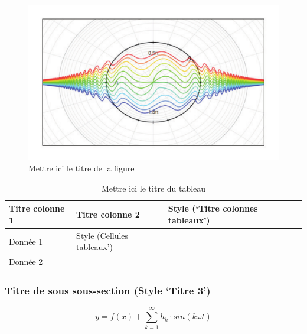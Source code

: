 \documentclass[a4paper,10pt,twocolumn]{article}
\begin{document}
\begin{figure}[!ht]
	\begin{center}
		\includegraphics[width=\columnwidth]{fig_1.pdf}
	\end{center}
	
	\caption{Mettre ici le titre de la figure}
	\label{fig_1}
\end{figure}

\begin{table}[!h]
	\caption{Mettre ici le titre du tableau}
	
	\begin{center}
		\begin{tabular}{|>{\footnotesize}L{1.4cm}|>{\footnotesize}L{1.5cm}|>{\footnotesize}L{2.4cm}|>{\footnotesize}L{2.1cm}|}
			\hline
			\textbf{Titre colonne 1} & \textbf{Titre colonne 2} & \textbf{Style (‘Titre colonnes tableaux’)} & \textbf{} \\
			\hline
			Donnée 1 & Style (Cellules tableaux’) & & \\
			\hline
			Donnée 2 & & & \\
			\hline
		\end{tabular}
	\end{center}
	
	\label{tab_1}
\end{table}

\subsubsection{Titre de sous sous-section (Style ‘Titre 3’)}

\begin{equation}
	y = f(x) + \sum_{k=1}^{\infty} h_k \cdot sin(k \omega t)
	\label{eq_1}
\end{equation}
\end{document}
